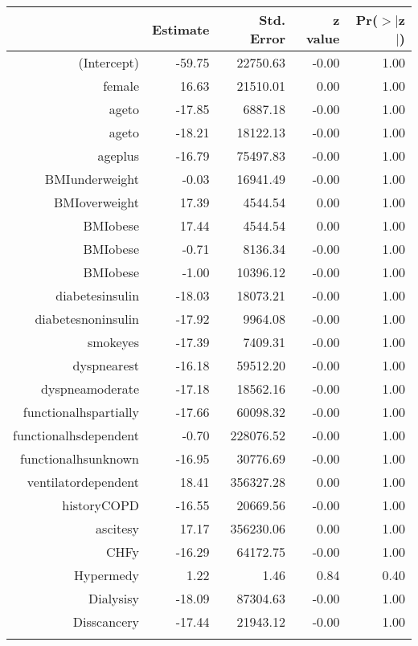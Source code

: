 \bigskip\bigskip
\centering
\begin{tabular}{rrrrr}
  \hline
 & Estimate & Std. Error & z value & Pr($>$$|$z$|$) \\ 
  \hline
(Intercept) & -59.75 & 22750.63 & -0.00 & 1.00 \\ 
  female & 16.63 & 21510.01 & 0.00 & 1.00 \\ 
  age\-65\-to\-74 & -17.85 & 6887.18 & -0.00 & 1.00 \\ 
  age\-75\-to\-84 & -18.21 & 18122.13 & -0.00 & 1.00 \\ 
  age\-85\-plus & -16.79 & 75497.83 & -0.00 & 1.00 \\ 
  BMI\-underweight & -0.03 & 16941.49 & -0.00 & 1.00 \\ 
  BMI\-overweight & 17.39 & 4544.54 & 0.00 & 1.00 \\ 
  BMI\-obese\-1 & 17.44 & 4544.54 & 0.00 & 1.00 \\ 
  BMI\-obese\-2 & -0.71 & 8136.34 & -0.00 & 1.00 \\ 
  BMI\-obese\-3 & -1.00 & 10396.12 & -0.00 & 1.00 \\ 
  diabetes\-insulin & -18.03 & 18073.21 & -0.00 & 1.00 \\ 
  diabetes\-noninsulin & -17.92 & 9964.08 & -0.00 & 1.00 \\ 
  smoke\-yes & -17.39 & 7409.31 & -0.00 & 1.00 \\ 
  dyspnea\-rest & -16.18 & 59512.20 & -0.00 & 1.00 \\ 
  dyspnea\-moderate & -17.18 & 18562.16 & -0.00 & 1.00 \\ 
  functional\-hs\-partially & -17.66 & 60098.32 & -0.00 & 1.00 \\ 
  functional\-hs\-dependent & -0.70 & 228076.52 & -0.00 & 1.00 \\ 
  functional\-hs\-unknown & -16.95 & 30776.69 & -0.00 & 1.00 \\ 
  ventilator\-dependent & 18.41 & 356327.28 & 0.00 & 1.00 \\ 
  history\-COPD & -16.55 & 20669.56 & -0.00 & 1.00 \\ 
  ascites\-y & 17.17 & 356230.06 & 0.00 & 1.00 \\ 
  CHF\-y & -16.29 & 64172.75 & -0.00 & 1.00 \\ 
  Hyper\-med\-y & 1.22 & 1.46 & 0.84 & 0.40 \\ 
  Dialysis\-y & -18.09 & 87304.63 & -0.00 & 1.00 \\ 
  Diss\-cancer\-y & -17.44 & 21943.12 & -0.00 & 1.00 \\ 
$$
\end{tabular}
